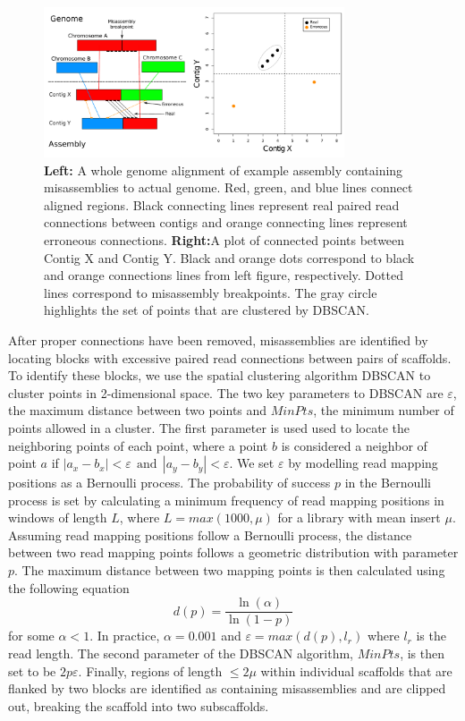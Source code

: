 \documentclass{bioinfo}
\begin{document}
\begin{figure}[t]
\includegraphics[width=3.5in]{fish-qc.pdf}
\vspace{-1cm}
\caption{\textbf{Left:}  A whole genome alignment of example assembly containing misassemblies to actual genome. 
Red, green, and blue lines connect aligned regions. Black connecting lines represent real paired read 
connections between contigs and orange connecting lines represent erroneous connections. \textbf{Right:}A plot 
of connected points between Contig X and Contig Y. Black and orange dots correspond
to black and orange connections lines from left figure, respectively. Dotted lines correspond
to misassembly breakpoints. The gray circle highlights the set of points that are clustered by DBSCAN. }\label{fig:02}
\end{figure}

After proper connections have been removed, misassemblies are identified by locating blocks with excessive 
paired read connections between pairs of scaffolds. To identify these blocks, we use the spatial clustering algorithm DBSCAN 
to cluster points in 2-dimensional space. The two key parameters to DBSCAN are $\varepsilon$, the maximum distance between 
two points and $MinPts$, the minimum number of points allowed in a cluster. The first parameter is used used to locate 
the neighboring points of each point, where a point $b$ is considered a neighbor of point $a$ if $|a_x - b_x| < \varepsilon 
~~\mbox{and}~~ |a_y - b_y| < \varepsilon$. We set $\varepsilon$ by modelling read mapping positions as a Bernoulli process. 
The probability of success $p$ in the Bernoulli process is set by calculating a minimum frequency of read mapping positions
in windows of length $L$, where $L = max(1000,\mu)$ for a library with mean insert $\mu$. Assuming read mapping positions 
follow a Bernoulli process, the distance between two read mapping points follows a geometric distribution with parameter $p$.
The maximum distance between two mapping points is then calculated using the following equation
\begin{equation}
	d(p) = \dfrac{\ln(\alpha)}{\ln(1-p)}
\end{equation} 
for some $\alpha < 1$. In practice, $\alpha = 0.001$ and $\varepsilon = max(d(p),l_r)$ where $l_r$ is the read length.
The second parameter of the DBSCAN algorithm, $MinPts$, is then set to be $2p\varepsilon$.
Finally, regions of length $\le 2\mu$ within individual scaffolds that are flanked by two blocks are identified as containing
misassemblies and are clipped out, breaking the scaffold into two subscaffolds.
\end{document}
